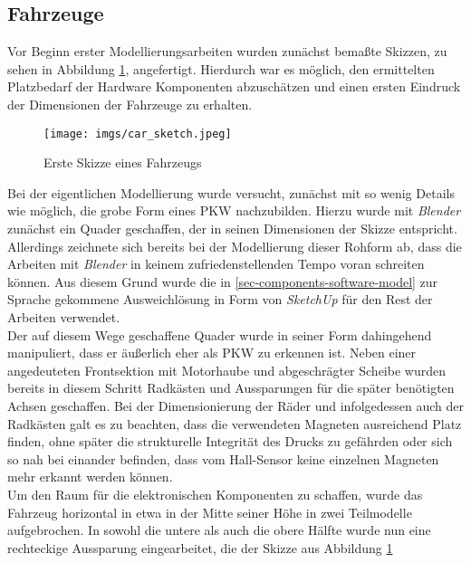 \documentclass[.../Dokumentation.tex]{subfiles}
\begin{document}
\subsection{Fahrzeuge}\label{sec-ita1-cars}
Vor Beginn erster Modellierungsarbeiten wurden zunächst bemaßte Skizzen, 
zu sehen in Abbildung \ref{fig-car-sketch}, angefertigt. 
Hierdurch war es möglich, den ermittelten Platzbedarf der Hardware 
Komponenten abzuschätzen und einen ersten Eindruck der Dimensionen der 
Fahrzeuge zu erhalten.\\
\begin{figure}[H]
    \begin{center}
    \texttt{[image: imgs/car\_sketch.jpeg]}
    \caption{Erste Skizze eines Fahrzeugs}
    \label{fig-car-sketch}
\end{center}
\end{figure}
\noindent
Bei der eigentlichen Modellierung wurde versucht, zunächst mit so wenig 
Details wie möglich, die grobe Form eines PKW nachzubilden. Hierzu wurde mit 
\textit{Blender} zunächst ein Quader geschaffen, der in seinen Dimensionen 
der Skizze entspricht.\\
Allerdings zeichnete sich bereits bei der Modellierung dieser Rohform ab, 
dass die Arbeiten mit \textit{Blender} in keinem zufriedenstellenden Tempo 
voran schreiten können. Aus diesem Grund wurde die in 
\ref{sec-components-software-model} zur Sprache gekommene Ausweichlösung in 
Form von \textit{SketchUp} für den Rest der Arbeiten verwendet.\\
Der auf diesem Wege geschaffene Quader wurde in seiner Form dahingehend 
manipuliert, dass er äußerlich eher als PKW zu erkennen ist. 
Neben einer angedeuteten Frontsektion mit Motorhaube und abgeschrägter Scheibe 
wurden bereits in diesem Schritt Radkästen und Aussparungen für die später 
benötigten Achsen geschaffen. 
Bei der Dimensionierung der Räder und infolgedessen auch der Radkästen galt 
es zu beachten, dass die verwendeten Magneten ausreichend Platz finden, 
ohne später die strukturelle Integrität des Drucks zu gefährden oder sich so 
nah bei einander befinden, dass vom Hall-Sensor keine einzelnen Magneten 
mehr erkannt werden können.\\
Um den Raum für die elektronischen Komponenten zu schaffen, wurde das Fahrzeug 
horizontal in etwa in der Mitte seiner Höhe in zwei Teilmodelle aufgebrochen.
In sowohl die untere als auch die obere Hälfte wurde nun eine rechteckige 
Aussparung eingearbeitet, die der Skizze aus Abbildung \ref{fig-car-sketch} 
\end{document}
